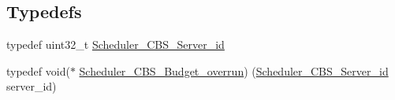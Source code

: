 \subsection*{Typedefs}
\begin{DoxyCompactItemize}
\item 
typedef uint32\+\_\+t \mbox{\hyperlink{group__RTEMSScoreSchedulerCBS_gaec8b0a87aaeee5befd176ed946ad60a7}{Scheduler\+\_\+\+C\+B\+S\+\_\+\+Server\+\_\+id}}
\item 
typedef void($\ast$ \mbox{\hyperlink{group__RTEMSScoreSchedulerCBS_ga71e1a7a66ea3c1fcb7e25e900f773858}{Scheduler\+\_\+\+C\+B\+S\+\_\+\+Budget\+\_\+overrun}}) (\mbox{\hyperlink{group__RTEMSScoreSchedulerCBS_gaec8b0a87aaeee5befd176ed946ad60a7}{Scheduler\+\_\+\+C\+B\+S\+\_\+\+Server\+\_\+id}} server\+\_\+id)
\end{DoxyCompactItemize}
